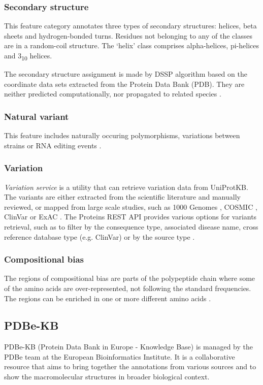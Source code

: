 \subsubsection{Secondary structure}
This feature category annotates three types of secondary structures: helices, beta sheets and hydrogen-bonded turns. Residues not belonging to any of the classes are in a random-coil structure. The `helix' class comprises alpha-helices, pi-helices and 3\textsubscript{10} helices.

The secondary structure assignment is made by DSSP algorithm \cite{dssp} based on the coordinate data sets extracted from the Protein Data Bank (PDB). They are neither predicted computationally, nor propagated to related species \cite{sec_str}.

\subsubsection{Natural variant}
This feature includes naturally occuring polymorphisms, variations between strains or RNA editing events \cite{natural_variant}.

\subsubsection{Variation}
\textit{Variation service} is a utility that can retrieve variation data from UniProtKB. The variants are either extracted from the scientific literature and manually reviewed, or mapped from large scale studies, such as 1000 Genomes \cite{1000genomes}, COSMIC \cite{cosmic}, ClinVar \cite{clinvar} or ExAC \cite{exac}. The Proteins REST API provides various options for variants retrieval, such as to filter by the consequence type, associated disease name, cross reference database type (e.g. ClinVar) or by the source type \cite{proteins_api}.


\subsubsection{Compositional bias}
The regions of compositional bias are parts of the polypeptide chain where some of the amino acids are over-represented, not following the standard frequencies. The regions can be enriched in one or more different amino acids \cite{compbias}.



\subsection{PDBe-KB}
PDBe-KB (Protein Data Bank in Europe - Knowledge Base) is managed by the PDBe team at the European Bioinformatics Institute. It is a collaborative resource that aims to bring together the annotations from various sources and to show the macromolecular structures in broader biological context. 

